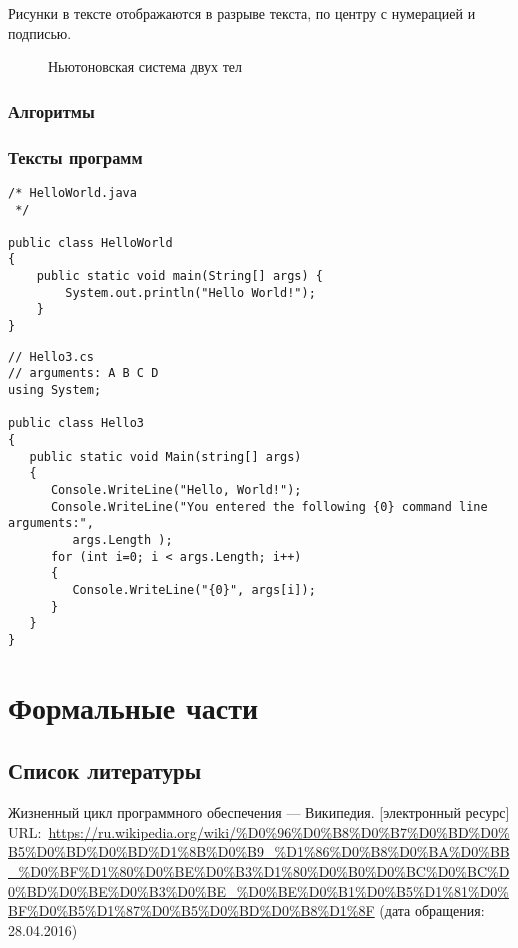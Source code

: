 \documentclass[a4paper,14pt,final]{extreport}
\begin{document}
Рисунки в тексте отображаются в разрыве текста, по центру с нумерацией и подписью.
\begin{figure}[bh]
  \centering
  \def\svgwidth{0.8\linewidth}
  


  \caption{Ньютоновская система двух тел}
  \label{fig:bodies}
\end{figure}


\subsection{Алгоритмы}
\label{sec:algs}

\subsection{Тексты программ}
\label{sec:sources}

\begin{verbatim}
/* HelloWorld.java
 */

public class HelloWorld
{
	public static void main(String[] args) {
		System.out.println("Hello World!");
	}
}
\end{verbatim}

\begin{verbatim}
// Hello3.cs
// arguments: A B C D
using System;

public class Hello3
{
   public static void Main(string[] args)
   {
      Console.WriteLine("Hello, World!");
      Console.WriteLine("You entered the following {0} command line arguments:",
         args.Length );
      for (int i=0; i < args.Length; i++)
      {
         Console.WriteLine("{0}", args[i]);
      }
   }
}
\end{verbatim}

\chapter{Формальные части}
\label{cha:formal}

\section{Список литературы}
\label{sec:refs}

\begin{thebibliography}{99}
 Жизненный цикл программного обеспечения --- Википедия. [электронный ресурс] URL:~\url{https://ru.wikipedia.org/wiki/%D0%96%D0%B8%D0%B7%D0%BD%D0%B5%D0%BD%D0%BD%D1%8B%D0%B9_%D1%86%D0%B8%D0%BA%D0%BB_%D0%BF%D1%80%D0%BE%D0%B3%D1%80%D0%B0%D0%BC%D0%BC%D0%BD%D0%BE%D0%B3%D0%BE_%D0%BE%D0%B1%D0%B5%D1%81%D0%BF%D0%B5%D1%87%D0%B5%D0%BD%D0%B8%D1%8F} (дата обращения: 28.04.2016)
\end{thebibliography}
\end{document}
